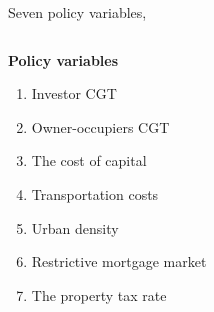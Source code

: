 \documentclass[]{beamer} %
\begin{document}


\begin{frame}{Seven policy variables, }
\Large
\begin{columns}
    \begin{column}{0.5\textwidth}
   
        \textbf{Policy variables}%
        \begin{enumerate}
        \item {Investor CGT}
        \item Owner-occupiers CGT
        \item The cost of capital%
        \item Transportation costs%
        \item Urban density%
        \item Restrictive mortgage market%
        \item The property tax rate%
    \end{enumerate}

    \end{column}


\end{columns}
\end{frame}
\end{document}
